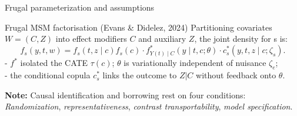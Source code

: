 \documentclass[t]{beamer}
\newcommand{\E}{\mathrm{E}}
\newcommand{\ci}{\perp\!\!\!\perp}
\begin{document}
\begin{frame}{Frugal parameterization and assumptions}


    \begin{block}{Frugal MSM factorisation (Evans \& Didelez, 2024)}
    Partitioning covariates $W = (C, Z)$ into effect modifiers $C$ and auxiliary $Z$, the joint density for s is:
    \begin{equation*}
        f_s(y, t, w) = f_s(t, z \mid c) f_s(c) \cdot f^*_{Y(t)\mid C}(y \mid t, c; \theta) \cdot c^*_s(y, t, z \mid c; \zeta_s).
    \end{equation*}
    - $f^*$ isolated the CATE $\tau(c)$; $\theta$ is variationally independent of nuisance $\zeta_e$;\\
    - the conditional copula $c^*_s$ links the outcome to $Z | C$ without feedback onto $\theta$.
    \end{block}
    
    \vspace{0.6cm}
    \textbf{Note:} Causal identification and borrowing rest on four conditions: \emph{Randomization}, \emph{representativeness}, \emph{contrast transportability}, \emph{model specification}.
    
\end{frame}
\end{document}
